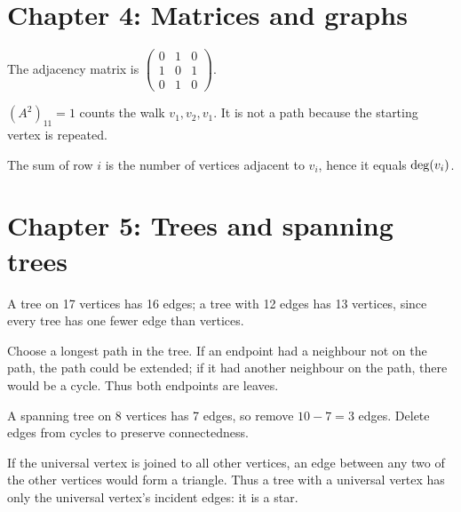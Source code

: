 \section*{Chapter 4: Matrices and graphs}
\begin{description}[style=nextline]
\item[4.1] The adjacency matrix is $\begin{pmatrix}0&1&0\\1&0&1\\0&1&0\end{pmatrix}$.
\item[4.2] $(A^2)_{11}=1$ counts the walk $v_1,v_2,v_1$. It is not a path because the starting vertex is repeated.
\item[4.3] The sum of row $i$ is the number of vertices adjacent to $v_i$, hence it equals $\operatorname{deg}(v_i)$.
\end{description}

\section*{Chapter 5: Trees and spanning trees}
\begin{description}[style=nextline]
\item[5.1] A tree on 17 vertices has 16 edges; a tree with 12 edges has 13 vertices, since every tree has one fewer edge than vertices.
\item[5.2] Choose a longest path in the tree. If an endpoint had a neighbour not on the path, the path could be extended; if it had another neighbour on the path, there would be a cycle. Thus both endpoints are leaves.
\item[5.3] A spanning tree on 8 vertices has 7 edges, so remove $10-7=3$ edges. Delete edges from cycles to preserve connectedness.
\item[5.4] If the universal vertex is joined to all other vertices, an edge between any two of the other vertices would form a triangle. Thus a tree with a universal vertex has only the universal vertex's incident edges: it is a star.
\end{description}

